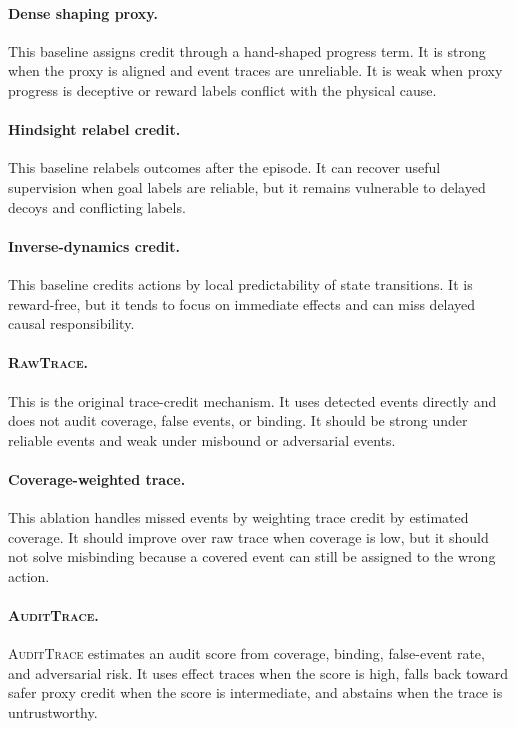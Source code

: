 \documentclass{article}
\newcommand{\method}{\textsc{AuditTrace}\xspace}
\newcommand{\rawtrace}{\textsc{RawTrace}\xspace}
\begin{document}
\paragraph{Dense shaping proxy.}
This baseline assigns credit through a hand-shaped progress term. It is strong when the proxy is aligned and event traces are unreliable. It is weak when proxy progress is deceptive or reward labels conflict with the physical cause.

\paragraph{Hindsight relabel credit.}
This baseline relabels outcomes after the episode. It can recover useful supervision when goal labels are reliable, but it remains vulnerable to delayed decoys and conflicting labels.

\paragraph{Inverse-dynamics credit.}
This baseline credits actions by local predictability of state transitions. It is reward-free, but it tends to focus on immediate effects and can miss delayed causal responsibility.

\paragraph{\rawtrace.}
This is the original trace-credit mechanism. It uses detected events directly and does not audit coverage, false events, or binding. It should be strong under reliable events and weak under misbound or adversarial events.

\paragraph{Coverage-weighted trace.}
This ablation handles missed events by weighting trace credit by estimated coverage. It should improve over raw trace when coverage is low, but it should not solve misbinding because a covered event can still be assigned to the wrong action.

\paragraph{\method.}
\method estimates an audit score from coverage, binding, false-event rate, and adversarial risk. It uses effect traces when the score is high, falls back toward safer proxy credit when the score is intermediate, and abstains when the trace is untrustworthy.
\end{document}
